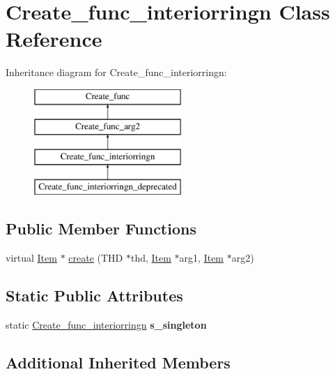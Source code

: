 \hypertarget{classCreate__func__interiorringn}{}\section{Create\+\_\+func\+\_\+interiorringn Class Reference}
\label{classCreate__func__interiorringn}
Inheritance diagram for Create\+\_\+func\+\_\+interiorringn\+:\begin{figure}[H]
\begin{center}
\leavevmode
\includegraphics[height=4.000000cm]{classCreate__func__interiorringn}
\end{center}
\end{figure}
\subsection*{Public Member Functions}
\begin{DoxyCompactItemize}
\item 
virtual \mbox{\hyperlink{classItem}{Item}} $\ast$ \mbox{\hyperlink{classCreate__func__interiorringn_a564661eda80116458adf7c15bf117c14}{create}} (T\+HD $\ast$thd, \mbox{\hyperlink{classItem}{Item}} $\ast$arg1, \mbox{\hyperlink{classItem}{Item}} $\ast$arg2)
\end{DoxyCompactItemize}
\subsection*{Static Public Attributes}
\begin{DoxyCompactItemize}
\item 
\mbox{\label{classCreate__func__interiorringn_a81cc81a0d462e7fbd8d06c735418e4e9}} 
static \mbox{\hyperlink{classCreate__func__interiorringn}{Create\+\_\+func\+\_\+interiorringn}} {\bfseries s\+\_\+singleton}
\end{DoxyCompactItemize}
\subsection*{Additional Inherited Members}


